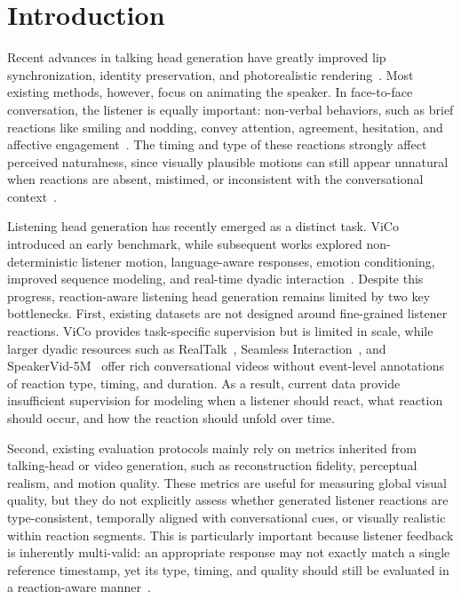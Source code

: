 \vspace{-1em}
\section{Introduction}

Recent advances in talking head generation have greatly improved lip synchronization, identity preservation, and photorealistic rendering~\cite{grassal2022neural,ma2024cvthead,prajwal2020lip,ji2021audio,liang2022expressive,zhang2023sadtalker,geng2023realtalk,zhu2025infp}. Most existing methods, however, focus on animating the speaker. In face-to-face conversation, the listener is equally important: non-verbal behaviors, such as brief reactions like smiling and nodding, convey attention, agreement, hesitation, and affective engagement~\cite{wang2025diffusion}. The timing and type of these reactions strongly affect perceived naturalness, since visually plausible motions can still appear unnatural when reactions are absent, mistimed, or inconsistent with the conversational context~\cite{murray2022learning,ng2022learning,de2012survey}.

Listening head generation has recently emerged as a distinct task. ViCo~\cite{zhou2022vico} introduced an early benchmark, while subsequent works explored non-deterministic listener motion, language-aware responses, emotion conditioning, improved sequence modeling, and real-time dyadic interaction~\cite{ng2022learning,ng2023can,song2023emotional,liu2024listenformer,zhu2025infp,guo2025arig}. Despite this progress, reaction-aware listening head generation remains limited by two key bottlenecks. First, existing datasets are not designed around fine-grained listener reactions. ViCo provides task-specific supervision but is limited in scale, while larger dyadic resources such as RealTalk~\cite{geng2023realtalk}, Seamless Interaction~\cite{agrawal2025seamless}, and SpeakerVid-5M~\cite{zhang2025speakervid5m} offer rich conversational videos without event-level annotations of reaction type, timing, and duration. As a result, current data provide insufficient supervision for modeling when a listener should react, what reaction should occur, and how the reaction should unfold over time.

Second, existing evaluation protocols mainly rely on metrics inherited from talking-head or video generation, such as reconstruction fidelity, perceptual realism, and motion quality. These metrics are useful for measuring global visual quality, but they do not explicitly assess whether generated listener reactions are type-consistent, temporally aligned with conversational cues, or visually realistic within reaction segments. This is particularly important because listener feedback is inherently multi-valid: an appropriate response may not exactly match a single reference timestamp, yet its type, timing, and quality should still be evaluated in a reaction-aware manner~\cite{de2012survey}.

